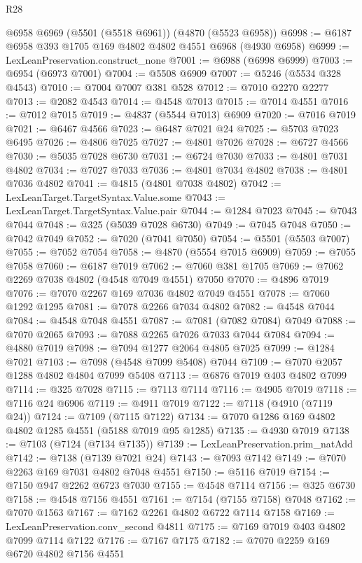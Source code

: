\begin{lexlean}{R28}
\begin{coremodule}
    @6958
    @6969
    (@5501 (@5518 @6961))
    (@4870 (@5523 @6958))
@6998 := @6187 @6958 @393 @1705 @169 @4802 @4802 @4551 @6968 (@4930 @6958)
@6999 := LexLeanPreservation.construct_none
@7001 := @6988 (@6998 @6999)
@7003 := @6954 (@6973 @7001)
@7004 := @5508 @6909
@7007 := @5246 (@5534 @328 @4543)
@7010 := @7004 @7007 @381 @528
@7012 := @7010 @2270 @2277
@7013 := @2082 @4543
@7014 := @4548 @7013
@7015 := @7014 @4551
@7016 := @7012 @7015
@7019 := @4837 (@5544 @7013) @6909
@7020 := @7016 @7019
@7021 := @6467 @4566
@7023 := @6487 @7021 @24
@7025 := @5703 @7023 @6495
@7026 := @4806 @7025
@7027 := @4801 @7026
@7028 := @6727 @4566
@7030 := @5035 @7028 @6730
@7031 := @6724 @7030
@7033 := @4801 @7031 @4802
@7034 := @7027 @7033
@7036 := @4801 @7034 @4802
@7038 := @4801 @7036 @4802
@7041 := @4815 (@4801 @7038 @4802)
@7042 := LexLeanTarget.TargetSyntax.Value.some
@7043 := LexLeanTarget.TargetSyntax.Value.pair
@7044 := @1284 @7023
@7045 := @7043 @7044
@7048 := @325 (@5039 @7028 @6730)
@7049 := @7045 @7048
@7050 := @7042 @7049
@7052 := @7020 (@7041 @7050)
@7054 := @5501 (@5503 @7007)
@7055 := @7052 @7054
@7058 := @4870 (@5554 @7015 @6909)
@7059 := @7055 @7058
@7060 := @6187 @7019
@7062 := @7060 @381 @1705
@7069 := @7062 @2269 @7038 @4802 (@4548 @7049 @4551) @7050
@7070 := @4896 @7019
@7076 := @7070 @2267 @169 @7036 @4802 @7049 @4551
@7078 := @7060 @1292 @1295
@7081 := @7078 @2266 @7034 @4802
@7082 := @4548 @7044
@7084 := @4548 @7048 @4551
@7087 := @7081 (@7082 @7084) @7049
@7088 := @7070 @2065
@7093 := @7088 @2265 @7026 @7033 @7044 @7084
@7094 := @4880 @7019
@7098 := @7094 @1277 @2064 @4805 @7025
@7099 := @1284 @7021
@7103 := @7098 (@4548 @7099 @5408) @7044
@7109 := @7070 @2057 @1288 @4802 @4804 @7099 @5408
@7113 := @6876 @7019 @403 @4802 @7099
@7114 := @325 @7028
@7115 := @7113 @7114
@7116 := @4905 @7019
@7118 := @7116 @24 @6906
@7119 := @4911 @7019
@7122 := @7118 (@4910 (@7119 @24))
@7124 := @7109 (@7115 @7122)
@7134 := @7070 @1286 @169 @4802 @4802 @1285 @4551 (@5188 @7019 @95 @1285)
@7135 := @4930 @7019
@7138 := @7103 (@7124 (@7134 @7135))
@7139 := LexLeanPreservation.prim_natAdd
@7142 := @7138 (@7139 @7021 @24)
@7143 := @7093 @7142
@7149 := @7070 @2263 @169 @7031 @4802 @7048 @4551
@7150 := @5116 @7019
@7154 := @7150 @947 @2262 @6723 @7030
@7155 := @4548 @7114
@7156 := @325 @6730
@7158 := @4548 @7156 @4551
@7161 := @7154 (@7155 @7158) @7048
@7162 := @7070 @1563
@7167 := @7162 @2261 @4802 @6722 @7114 @7158
@7169 := LexLeanPreservation.conv_second @4811
@7175 := @7169 @7019 @403 @4802 @7099 @7114 @7122
@7176 := @7167 @7175
@7182 := @7070 @2259 @169 @6720 @4802 @7156 @4551

\end{coremodule}
\end{lexlean}
